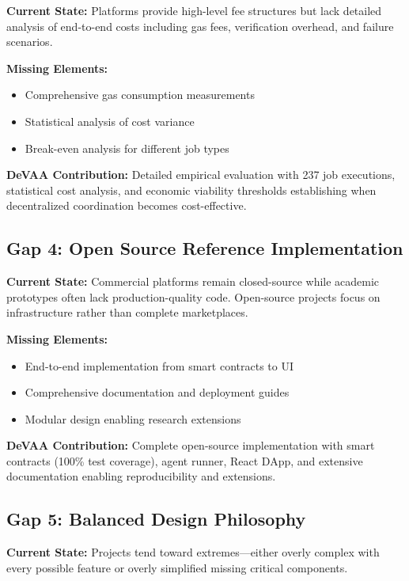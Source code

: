 \textbf{Current State:} Platforms provide high-level fee structures but lack detailed analysis of end-to-end costs including gas fees, verification overhead, and failure scenarios.

\textbf{Missing Elements:}
\begin{itemize}
    \item Comprehensive gas consumption measurements
    \item Statistical analysis of cost variance
    \item Break-even analysis for different job types
\end{itemize}

\textbf{DeVAA Contribution:} Detailed empirical evaluation with 237 job executions, statistical cost analysis, and economic viability thresholds establishing when decentralized coordination becomes cost-effective.

\subsection{Gap 4: Open Source Reference Implementation}

\textbf{Current State:} Commercial platforms remain closed-source while academic prototypes often lack production-quality code. Open-source projects focus on infrastructure rather than complete marketplaces.

\textbf{Missing Elements:}
\begin{itemize}
    \item End-to-end implementation from smart contracts to UI
    \item Comprehensive documentation and deployment guides
    \item Modular design enabling research extensions
\end{itemize}

\textbf{DeVAA Contribution:} Complete open-source implementation with smart contracts (100\% test coverage), agent runner, React DApp, and extensive documentation enabling reproducibility and extensions.

\subsection{Gap 5: Balanced Design Philosophy}

\textbf{Current State:} Projects tend toward extremes—either overly complex with every possible feature or overly simplified missing critical components.

